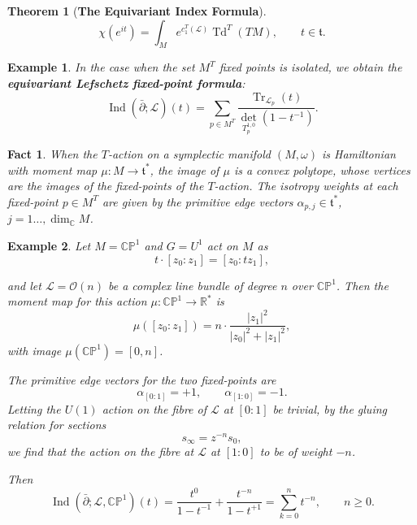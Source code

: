 \documentclass{article}
\newtheorem{theorem}{Theorem}[section]
\newtheorem{example}{Example}
\newtheorem{fact}{Fact}
\newcommand{\ra}{\rightarrow}
\newcommand{\w}{\omega}
\newcommand{\PP}{\mathbb{P}}
\newcommand{\RR}{\mathbb{R}}
\newcommand{\CC}{\mathbb{C}}
\newcommand{\mcL}{\mathcal{L}}
\newcommand{\mcO}{\mathcal{O}}
\newcommand{\mft}{\mathfrak{t}}
\DeclareMathOperator{\Tr}{Tr}
\DeclareMathOperator{\Td}{Td}
\DeclareMathOperator{\Ind}{Ind}
\begin{document}
\begin{theorem}[\textbf{The Equivariant Index Formula}]
	\begin{equation*}
		\chi(e^{it}) = \int_{M} e^{c_{1}^{T}(\mcL)} \Td^{T}(TM), \qquad t \in \mft.
	\end{equation*}
\end{theorem}

\begin{example}
	In the case when the set $M^{T}$ fixed points is isolated, we obtain the \textbf{equivariant Lefschetz fixed-point formula}:
	\begin{equation*}
		\Ind(\bar{\partial}; \mcL)(t) = \sum\limits_{p \in M^{T}} \frac{\Tr_{\mcL_{p}}(t)}{\det_{T_{p}^{1,0}}(1 - t^{-1})}.
	\end{equation*}
\end{example}

\begin{fact}
	When the $T$-action on a symplectic manifold $(M, \w)$ is Hamiltonian with moment map $\mu : M \ra \mft^{\ast}$, the image of $\mu$ is a convex polytope, whose vertices are the images of the fixed-points of the $T$-action. The isotropy weights at each fixed-point $p \in M^{T}$ are given by the primitive edge vectors $\alpha_{p,j} \in \mft^{\ast}$, $j = 1\ldots, \dim_{\CC} M$.
\end{fact}

\begin{example}
	Let $M = \CC\PP^{1}$ and $G = U^{1}$ act on $M$ as
	\begin{equation*}
		t \cdot [z_{0}: z_{1}] = [z_{0} : tz_{1}],
	\end{equation*}

	and let $\mcL = \mcO(n)$ be a complex line bundle of degree $n$ over $\CC\PP^{1}$. Then the moment map for this action $\mu : \CC\PP^{1} \ra \RR^{\ast}$ is
	\begin{equation*}
		\mu([z_{0}:z_{1}]) = n\cdot\frac{|z_{1}|^{2}}{|z_{0}|^{2} + |z_{1}|^{2}},
	\end{equation*}
	with image $\mu(\CC\PP^{1}) = [0, n]$.
	
	The primitive edge vectors for the two fixed-points are
	\begin{equation*}
		\alpha_{[0:1]} = +1, \qquad \alpha_{[1:0]} = -1.
	\end{equation*}
	Letting the $U(1)$ action on the fibre of $\mcL$ at $[0:1]$ be trivial, by the gluing relation for sections
	\begin{equation*}
		s_{\infty} = z^{-n}s_{0},
	\end{equation*}	
	we find that the action on the fibre at $\mcL$ at $[1:0]$ to be of weight $-n$.
	
	Then
	\begin{equation*}
		\Ind(\bar{\partial}; \mcL, \CC\PP^{1})(t) = \frac{t^{0}}{1 - t^{-1}} + \frac{t^{-n}}{1 - t^{+1}} = \sum_{k = 0}^{n}t^{-n}, \qquad n \geq 0.
	\end{equation*}
\end{example}
\end{document}
